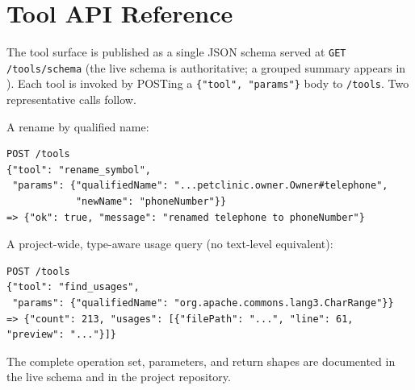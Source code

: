 \documentclass[11pt,a4paper]{report}
\begin{document}
\tableofcontents
\listoffigures
\listoftables











\appendix
\chapter{Tool API Reference}
The tool surface is published as a single JSON schema served at
\texttt{GET /tools/schema} (the live schema is authoritative; a grouped summary appears
in ). Each tool is invoked by POSTing a \texttt{\{"tool",\,"params"\}}
body to \texttt{/tools}. Two representative calls follow.

A rename by qualified name:
\begin{lstlisting}[basicstyle=\ttfamily\footnotesize]
POST /tools
{"tool": "rename_symbol",
 "params": {"qualifiedName": "...petclinic.owner.Owner#telephone",
            "newName": "phoneNumber"}}
=> {"ok": true, "message": "renamed telephone to phoneNumber"}
\end{lstlisting}

A project-wide, type-aware usage query (no text-level equivalent):
\begin{lstlisting}[basicstyle=\ttfamily\footnotesize]
POST /tools
{"tool": "find_usages",
 "params": {"qualifiedName": "org.apache.commons.lang3.CharRange"}}
=> {"count": 213, "usages": [{"filePath": "...", "line": 61, "preview": "..."}]}
\end{lstlisting}
The complete operation set, parameters, and return shapes are documented in the live
schema and in the project repository.
\end{document}
